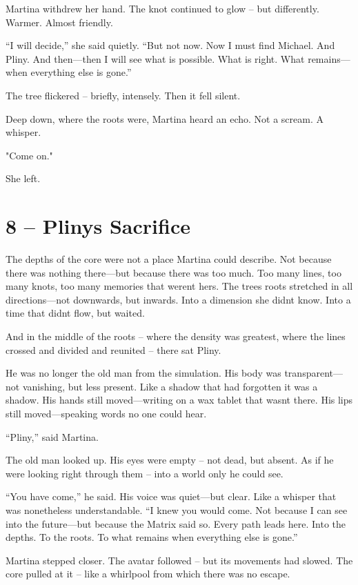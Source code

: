 \documentclass[
]{article}
\begin{document}
Martina withdrew her hand. The knot continued to glow -- but differently. Warmer. Almost friendly.

``I will decide,'' she said quietly. ``But not now. Now I must find Michael. And Pliny. And then---then I will see what is possible. What is right. What remains---when everything else is gone.''

The tree flickered -- briefly, intensely. Then it fell silent.

Deep down, where the roots were, Martina heard an echo. Not a scream. A whisper.

"Come on."

She left.

\section{8 -- Pliny\textquotesingle s Sacrifice}\label{plinys-sacrifice}

The depths of the core were not a place Martina could describe. Not because there was nothing there---but because there was too much. Too many lines, too many knots, too many memories that weren\textquotesingle t hers. The tree\textquotesingle s roots stretched in all directions---not downwards, but inwards. Into a dimension she didn\textquotesingle t know. Into a time that didn\textquotesingle t flow, but waited.

And in the middle of the roots -- where the density was greatest, where the lines crossed and divided and reunited -- there sat Pliny.

He was no longer the old man from the simulation. His body was transparent---not vanishing, but less present. Like a shadow that had forgotten it was a shadow. His hands still moved---writing on a wax tablet that wasn\textquotesingle t there. His lips still moved---speaking words no one could hear.

``Pliny,'' said Martina.

The old man looked up. His eyes were empty -- not dead, but absent. As if he were looking right through them -- into a world only he could see.

``You have come,'' he said. His voice was quiet---but clear. Like a whisper that was nonetheless understandable. ``I knew you would come. Not because I can see into the future---but because the Matrix said so. Every path leads here. Into the depths. To the roots. To what remains when everything else is gone.''

Martina stepped closer. The avatar followed -- but its movements had slowed. The core pulled at it -- like a whirlpool from which there was no escape.
\end{document}
